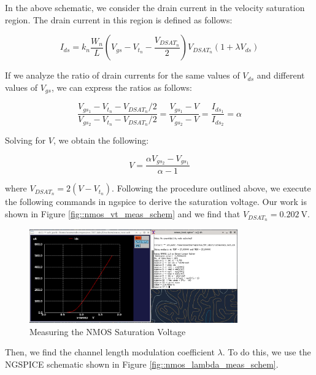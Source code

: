 \documentclass[fleqn]{article}
\begin{document}
	 \noindent In the above schematic, we consider the drain current in the velocity saturation region. The drain current in this region is defined as follows:
	
	\begin{equation}
		\label{eq::nmos_sat_current}
		I_{ds} = k_n\frac{W_n}{L}\left(V_{gs} - V_{t_n} - \frac{V_{DSAT_n}}{2}\right)V_{DSAT_n}(1 + {\lambda}V_{ds})
	\end{equation}
	
	\noindent If we analyze the ratio of drain currents for the same values of $V_{ds}$ and different values of $V_{gs}$, we can express the ratios as follows:
	
	\begin{equation}
		\frac{V_{gs_1} - V_{t_n} - V_{DSAT_n}/2}{V_{gs_2} - V_{t_n} - V_{DSAT_n}/2} = \frac{V_{gs_1} - V}{V_{gs_2} - V} = \frac{I_{ds_1}}{I_{ds_2}} = \alpha
	\end{equation}
	
	\noindent Solving for $V$, we obtain the following:
	
	\begin{equation}
		V = \frac{{\alpha}V_{gs_2} - V_{gs_1}}{\alpha - 1}
	\end{equation}
	
	\noindent where $V_{DSAT_n} = 2(V - V_{t_n})$. Following the procedure outlined above, we execute the following commands in ngspice to derive the saturation voltage. Our work is shown in Figure \ref{fig::nmos_vt_meas_schem} and we find that $V_{DSAT_n} = 0.202\ \text{V}$.
	
	\begin{figure}[H]
		\centerline{\includegraphics[width=0.8\textwidth]{nmos_vdsat_meas.png}}
		\caption{Measuring the NMOS Saturation Voltage}
		\label{fig::nmos_vdsat_meas}
	\end{figure}
	
	Then, we find the channel length modulation coefficient $\lambda$. To do this, we use the NGSPICE schematic shown in Figure \ref{fig::nmos_lambda_meas_schem}.
	
\end{document}
